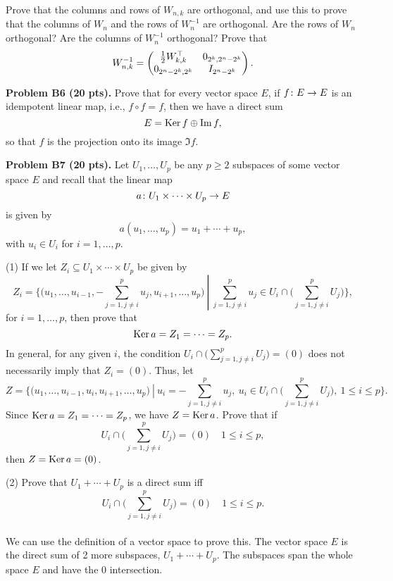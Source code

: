 \documentclass[12pt]{article}
\begin{document}
\medskip
Prove that the columns and rows of $W_{n, k}$ are orthogonal, and use
this to prove that the columns of $W_n$ and the rows of
$W_n^{-1}$ are orthogonal. 
Are the rows of  $W_n$ orthogonal?
Are the columns of  $W_n^{-1}$ orthogonal?
Prove that
\[
W_{n, k}^{-1} = 
\begin{pmatrix}
 \frac{1}{2}W_{k, k}^{\top} & 0_{2^{k}, 2^{n} - 2^{k}} \\
0_{2^{n}- 2^{k}, 2^k} &  I_{2^{n} - 2^{k}}
\end{pmatrix}.
\]


\vspace {0.25cm}\noindent
{\bf Problem B6 (20 pts).}
Prove that 
for every vector space $E$, if $f\colon E\rightarrow E$ is an idempotent
linear map, i.e., $f\circ f = f$, then we have a direct sum
\[
E = {\rm Ker}\,{f} \oplus {\rm Im}\,{f},
\]
so that $f$ is the projection onto its image $\Im{f}$.



\vspace {0.25cm}\noindent
{\bf Problem B7 (20 pts).}
Let $U_1, \ldots, U_p$ be any  $p \geq 2$  subspaces of some vector
space $E$ and recall that the linear map
\[
a\colon U_1\times \cdots \times U_p\rightarrow E
\]
is given by
\[
a(u_1, \ldots, u_p) = u_1 + \cdots + u_p,
\]
with $u_i \in U_i$ for $i = 1, \ldots, p$.

\medskip
(1)
If we let $Z_i \subseteq U_1\times \cdots \times U_p$ be given by
\[
Z_i = \left.\bigg\{\Big(u_1, \ldots, u_{i - 1}, -\sum_{j = 1, j \not= i}^p u_j, u_{i + 1}, 
\ldots, u_p\Big) \>\right|\> \sum_{j = 1, j \not= i}^p u_j  \in  
U_i \cap \bigg(\sum_{j = 1, j \not= i}^p U_j \bigg) 
\bigg\},
\]
for $i = 1, \ldots, p$, then prove that
\[
{\rm Ker}\,{a} = Z_1 = \cdots =   Z_p.
\]
In general, for any given $i$, the condition
$U_i \cap \bigg(\sum_{j = 1, j \not= i}^p U_j \bigg) =
(0)$ does not necessarily imply that $Z_i = (0)$.
Thus, let 
\[
Z = \left.\bigg\{\Big(u_1, \ldots, u_{i - 1}, u_i, u_{i + 1}, 
\ldots, u_p\Big) \>\right|\> u_i =  -\sum_{j = 1, j \not= i}^p u_j, \>
u_i   \in  
U_i \cap \bigg(\sum_{j = 1, j \not= i}^p U_j \bigg), \> 1\leq i \leq p 
\bigg\}.
\]
Since ${\rm Ker}\,{a} = Z_1 = \cdots =  Z_p$, we have $Z = {\rm Ker}\, a$.
Prove that if
\[
U_i \cap \bigg(\sum_{j = 1, j \not= i}^p U_j \bigg) = (0)
\quad 1 \leq i \leq p,
\]
then $Z = {\rm Ker}\, a = (0)$.

\medskip
(2)
Prove that $U_1 + \cdots + U_p$ is a direct sum iff
\[
U_i \cap \bigg(\sum_{j = 1, j \not= i}^p U_j \bigg) = (0)
\quad 1 \leq i \leq p.
\] \\

We can use the definition of a vector space to prove this. The vector space $E$ is the direct sum of 2 more subspaces, $U_1 + \cdots + U_p$. The subspaces span the whole space $E$ and have the ${0}$ intersection.  
\end{document}
